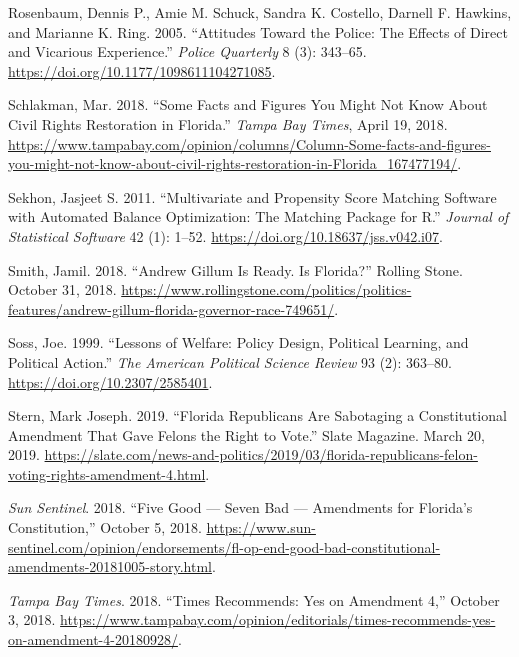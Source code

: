 \documentclass[
  12pt,
]{article}
\newlength{\cslhangindent}
\newenvironment{cslreferences}%
  {\setlength{\parindent}{0pt}%
  \everypar{\setlength{\hangindent}{\cslhangindent}}\ignorespaces}%
  {\par}
\begin{document}
\begin{cslreferences}
\leavevmode\hypertarget{ref-Rosenbaum2005}{}%
Rosenbaum, Dennis P., Amie M. Schuck, Sandra K. Costello, Darnell F. Hawkins, and Marianne K. Ring. 2005. ``Attitudes Toward the Police: The Effects of Direct and Vicarious Experience.'' \emph{Police Quarterly} 8 (3): 343--65. \url{https://doi.org/10.1177/1098611104271085}.

\leavevmode\hypertarget{ref-Schlakman2018}{}%
Schlakman, Mar. 2018. ``Some Facts and Figures You Might Not Know About Civil Rights Restoration in Florida.'' \emph{Tampa Bay Times}, April 19, 2018. \url{https://www.tampabay.com/opinion/columns/Column-Some-facts-and-figures-you-might-not-know-about-civil-rights-restoration-in-Florida_167477194/}.

\leavevmode\hypertarget{ref-Sekhon2011}{}%
Sekhon, Jasjeet S. 2011. ``Multivariate and Propensity Score Matching Software with Automated Balance Optimization: The Matching Package for R.'' \emph{Journal of Statistical Software} 42 (1): 1--52. \url{https://doi.org/10.18637/jss.v042.i07}.

\leavevmode\hypertarget{ref-Smith2018}{}%
Smith, Jamil. 2018. ``Andrew Gillum Is Ready. Is Florida?'' Rolling Stone. October 31, 2018. \url{https://www.rollingstone.com/politics/politics-features/andrew-gillum-florida-governor-race-749651/}.

\leavevmode\hypertarget{ref-Soss1999}{}%
Soss, Joe. 1999. ``Lessons of Welfare: Policy Design, Political Learning, and Political Action.'' \emph{The American Political Science Review} 93 (2): 363--80. \url{https://doi.org/10.2307/2585401}.

\leavevmode\hypertarget{ref-Stern2019}{}%
Stern, Mark Joseph. 2019. ``Florida Republicans Are Sabotaging a Constitutional Amendment That Gave Felons the Right to Vote.'' Slate Magazine. March 20, 2019. \url{https://slate.com/news-and-politics/2019/03/florida-republicans-felon-voting-rights-amendment-4.html}.

\leavevmode\hypertarget{ref-SunSentinelEditorial2018}{}%
\emph{Sun Sentinel}. 2018. ``Five Good --- Seven Bad --- Amendments for Florida's Constitution,'' October 5, 2018. \url{https://www.sun-sentinel.com/opinion/endorsements/fl-op-end-good-bad-constitutional-amendments-20181005-story.html}.

\leavevmode\hypertarget{ref-tampabaytimes2018}{}%
\emph{Tampa Bay Times}. 2018. ``Times Recommends: Yes on Amendment 4,'' October 3, 2018. \url{https://www.tampabay.com/opinion/editorials/times-recommends-yes-on-amendment-4-20180928/}.


\end{cslreferences}
\end{document}
